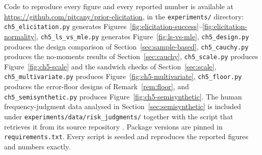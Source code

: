 \documentclass[11pt]{article}
\theoremstyle{remark}
\begin{document}
Code to reproduce every figure and every reported number is available at
\url{https://github.com/pitcany/prior-elicitation}, in the \texttt{experiments/}
directory: \texttt{ch5\_elicitation.py} generates
Figures~\ref{fig:elicitation-success}--\ref{fig:elicitation-normality},
\texttt{ch5\_ls\_vs\_mle.py} generates Figure~\ref{fig:ls-vs-mle},
\texttt{ch5\_design.py} produces the design comparison of
Section~\ref{sec:sample-based}, \texttt{ch5\_cauchy.py} produces the
no-moments results of Section~\ref{sec:cauchy}, \texttt{ch5\_scale.py}
produces Figure~\ref{fig:ch5-scale} and the sandwich checks of
Section~\ref{sec:scale}, \texttt{ch5\_multivariate.py} produces
Figure~\ref{fig:ch5-multivariate}, \texttt{ch5\_floor.py} produces the
error-floor designs of Remark~\ref{rem:floor}, and
\texttt{ch5\_semisynthetic.py} produces Figure~\ref{fig:ch5-semisynthetic}.
The human frequency-judgment data analysed in
Section~\ref{sec:semisynthetic} is included under
\texttt{experiments/data/risk\_judgments/} together with the script that
retrieves it from its source repository \cite{Pachur2024}. Package versions are
pinned in \texttt{requirements.txt}. Every script is seeded and reproduces the
reported figures and numbers exactly.
\end{document}
